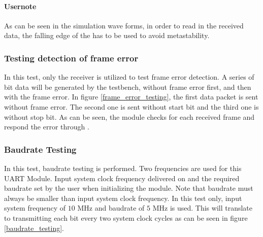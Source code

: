 
\paragraph*{Usernote}
As can be seen in the simulation wave forms, in order to read in the received data, the falling edge of the  has to be used to avoid metastability.

\subsubsection{Testing detection of frame error}
In this test, only the receiver is utilized to test frame error detection. A series of bit data will be generated by the testbench, without frame error first, and then with the frame error. In figure \ref{frame_error_testing}, the first data packet is sent without frame error. The second one is sent without start bit and the third one is without stop bit. As can be seen, the module checks for each received frame and respond the error through .


\newpage
\subsubsection{Baudrate Testing}
In this test, baudrate testing is performed. Two frequencies are used for this UART Module. Input system clock frequency delivered on  and the required baudrate set by the user when initializing the module. Note that baudrate must always be smaller than input system clock frequency. In this test only, input system frequency of $10$ MHz and baudrate of $5$ MHz is used. This will translate to transmitting each bit every two system clock cycles as can be seen in figure \ref{baudrate_testing}.


